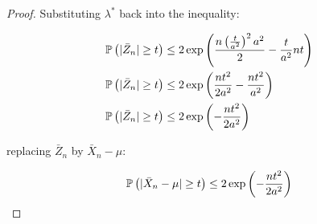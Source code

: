 \begin{proof}
Substituting $\lambda^*$ back into the inequality:

\begin{align*}
\mathbb{P}\left(|\bar{Z}_n| \geq t\right) &\leq
    2 \exp\left(\frac{n\left(\frac{t}{a^2}\right)^2a^2}{2} - \frac{t}{a^2} n t \right)\\
\mathbb{P}\left(|\bar{Z}_n| \geq t\right) &\leq
    2 \exp\left(\frac{nt^2}{2a^2} - \frac{nt^2}{a^2} \right)\\
\mathbb{P}\left(|\bar{Z}_n| \geq t\right) &\leq
    2 \exp\left(-\frac{nt^2}{2a^2} \right)\\
\end{align*}

replacing $\bar{Z}_n$ by $\bar{X}_n - \mu$:

\begin{align*}
\mathbb{P}\left(|\bar{X}_n - \mu| \geq t\right) \leq 2 \exp\left(-\frac{nt^2}{2 a^2}\right)
\end{align*}

\end{proof}